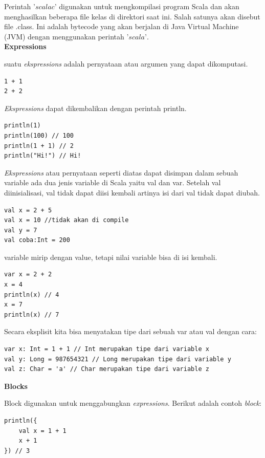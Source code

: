 \documentclass[a4paper,twoside]{article}
\begin{document}
\begin{enumerate}
Perintah $’scalac’$ digunakan untuk mengkompilasi program Scala dan akan menghasilkan beberapa file kelas di direktori saat ini. Salah satunya akan disebut file .class. Ini adalah bytecode yang akan berjalan di Java Virtual Machine (JVM) dengan menggunakan perintah $’scala’$. \\

\textbf{Expressions}

suatu \textit{ekspressions} adalah pernyataan atau argumen yang dapat dikomputasi.\\

\begin{verbatim}
1 + 1
2 + 2
\end{verbatim}


\textit{Ekspressions} dapat dikembalikan dengan perintah println.

\begin{verbatim}
println(1)
println(100) // 100
println(1 + 1) // 2
println("Hi!") // Hi!
\end{verbatim}


\textit{Ekspressions} atau pernyataan seperti diatas dapat disimpan dalam sebuah variable ada dua jenis variable di Scala yaitu val dan var. Setelah val diinisialisasi, val tidak dapat diisi kembali artinya isi dari val tidak dapat diubah.

\begin{verbatim}
val x = 2 + 5
val x = 10 //tidak akan di compile 
val y = 7
val coba:Int = 200 
\end{verbatim}

variable mirip dengan value, tetapi nilai variable bisa di isi kembali.

\begin{verbatim}
var x = 2 + 2 
x = 4 
println(x) // 4 
x = 7 
println(x) // 7 
\end{verbatim}

Secara eksplisit kita bisa menyatakan tipe dari sebuah var atau val dengan cara:

\begin{verbatim}
var x: Int = 1 + 1 // Int merupakan tipe dari variable x
val y: Long = 987654321 // Long merupakan tipe dari variable y
val z: Char = 'a' // Char merupakan tipe dari variable z
\end{verbatim}

\textbf{Blocks}

Block digunakan untuk menggabungkan \textit{expressions}. Berikut adalah contoh \textit{block}:

\begin{verbatim}
println({
    val x = 1 + 1
    x + 1
}) // 3 
\end{verbatim}


\end{enumerate}
\end{document}
